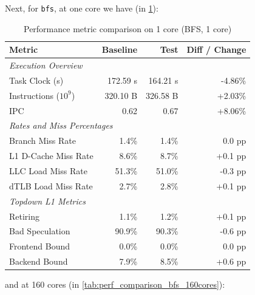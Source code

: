 \documentclass[leqno,11pt]{article}
\begin{document}
Next, for \texttt{bfs}, at one core we have (in \cref{tab:perf_comparison_bfs_1core}):
\begin{table}[htbp]
  \centering
  \caption{Performance metric comparison on 1 core (BFS, 1 core)}
  \label{tab:perf_comparison_bfs_1core}
  \begin{tabular}{lrrr}
    \toprule
    \textbf{Metric} & \textbf{Baseline} & \textbf{Test} & \textbf{Diff / Change} \\
    \midrule
    \multicolumn{4}{l}{\textit{Execution Overview}} \\
    \quad Task Clock (s)           & 172.59 s   & 164.21 s   & -4.86\%   \\
    \quad Instructions ($10^9$)    & 320.10 B   & 326.58 B   & +2.03\%   \\
    \quad IPC                      & 0.62       & 0.67       & +8.06\%   \\
    \midrule
    \multicolumn{4}{l}{\textit{Rates and Miss Percentages}} \\
    \quad Branch Miss Rate         & 1.4\%      & 1.4\%      & 0.0 pp    \\
    \quad L1 D-Cache Miss Rate     & 8.6\%      & 8.7\%      & +0.1 pp   \\
    \quad LLC Load Miss Rate       & 51.3\%     & 51.0\%     & -0.3 pp   \\
    \quad dTLB Load Miss Rate      & 2.7\%      & 2.8\%      & +0.1 pp   \\
    \midrule
    \multicolumn{4}{l}{\textit{Topdown L1 Metrics}} \\
    \quad Retiring                 & 1.1\%      & 1.2\%      & +0.1 pp   \\
    \quad Bad Speculation          & 90.9\%     & 90.3\%     & -0.6 pp   \\
    \quad Frontend Bound           & 0.0\%      & 0.0\%      & 0.0 pp    \\
    \quad Backend Bound            & 7.9\%      & 8.5\%      & +0.6 pp   \\
    \bottomrule
  \end{tabular}
\end{table}
and at 160 cores (in \cref{tab:perf_comparison_bfs_160cores}):
\end{document}
